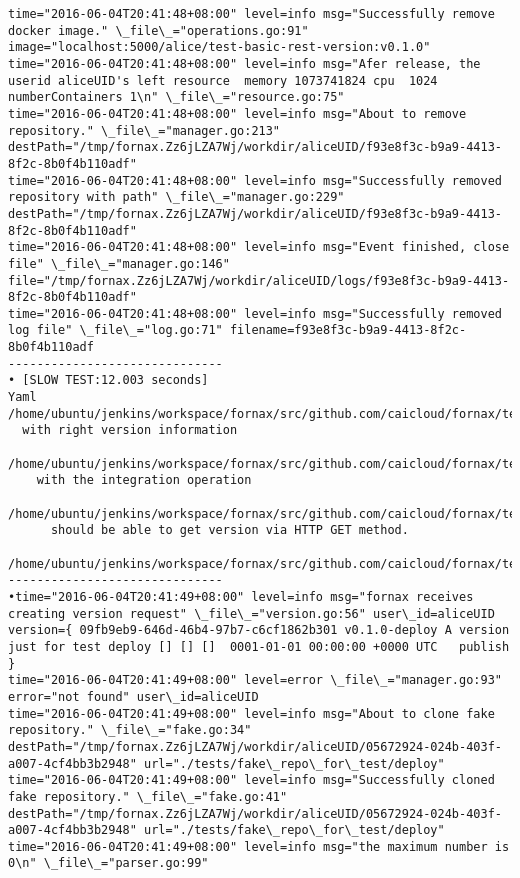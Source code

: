 \begin{lstlisting}[caption={Fornax功能性测试日志}]
time="2016-06-04T20:41:48+08:00" level=info msg="Successfully remove docker image." \_file\_="operations.go:91" image="localhost:5000/alice/test-basic-rest-version:v0.1.0" 
time="2016-06-04T20:41:48+08:00" level=info msg="Afer release, the userid aliceUID's left resource  memory 1073741824 cpu  1024 numberContainers 1\n" \_file\_="resource.go:75" 
time="2016-06-04T20:41:48+08:00" level=info msg="About to remove repository." \_file\_="manager.go:213" destPath="/tmp/fornax.Zz6jLZA7Wj/workdir/aliceUID/f93e8f3c-b9a9-4413-8f2c-8b0f4b110adf" 
time="2016-06-04T20:41:48+08:00" level=info msg="Successfully removed repository with path" \_file\_="manager.go:229" destPath="/tmp/fornax.Zz6jLZA7Wj/workdir/aliceUID/f93e8f3c-b9a9-4413-8f2c-8b0f4b110adf" 
time="2016-06-04T20:41:48+08:00" level=info msg="Event finished, close file" \_file\_="manager.go:146" file="/tmp/fornax.Zz6jLZA7Wj/workdir/aliceUID/logs/f93e8f3c-b9a9-4413-8f2c-8b0f4b110adf" 
time="2016-06-04T20:41:48+08:00" level=info msg="Successfully removed log file" \_file\_="log.go:71" filename=f93e8f3c-b9a9-4413-8f2c-8b0f4b110adf 
------------------------------
• [SLOW TEST:12.003 seconds]
Yaml
/home/ubuntu/jenkins/workspace/fornax/src/github.com/caicloud/fornax/tests/yaml/yaml\_test.go:243
  with right version information
  /home/ubuntu/jenkins/workspace/fornax/src/github.com/caicloud/fornax/tests/yaml/yaml\_test.go:242
    with the integration operation
    /home/ubuntu/jenkins/workspace/fornax/src/github.com/caicloud/fornax/tests/yaml/yaml\_test.go:194
      should be able to get version via HTTP GET method.
      /home/ubuntu/jenkins/workspace/fornax/src/github.com/caicloud/fornax/tests/yaml/yaml\_test.go:188
------------------------------
•time="2016-06-04T20:41:49+08:00" level=info msg="fornax receives creating version request" \_file\_="version.go:56" user\_id=aliceUID version={ 09fb9eb9-646d-46b4-97b7-c6cf1862b301 v0.1.0-deploy A version just for test deploy [] [] []  0001-01-01 00:00:00 +0000 UTC   publish } 
time="2016-06-04T20:41:49+08:00" level=error \_file\_="manager.go:93" error="not found" user\_id=aliceUID 
time="2016-06-04T20:41:49+08:00" level=info msg="About to clone fake repository." \_file\_="fake.go:34" destPath="/tmp/fornax.Zz6jLZA7Wj/workdir/aliceUID/05672924-024b-403f-a007-4cf4bb3b2948" url="./tests/fake\_repo\_for\_test/deploy" 
time="2016-06-04T20:41:49+08:00" level=info msg="Successfully cloned fake repository." \_file\_="fake.go:41" destPath="/tmp/fornax.Zz6jLZA7Wj/workdir/aliceUID/05672924-024b-403f-a007-4cf4bb3b2948" url="./tests/fake\_repo\_for\_test/deploy" 
time="2016-06-04T20:41:49+08:00" level=info msg="the maximum number is 0\n" \_file\_="parser.go:99" 

\end{lstlisting}
